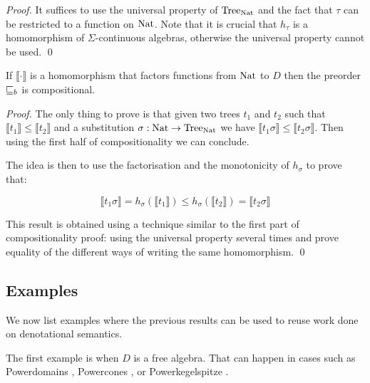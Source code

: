 \begin{proof}
    It suffices to use the universal property of $\textnormal{Tree}_{\textnormal{Nat}}$ 
    and the fact that $\tau$ can be restricted to a function 
    on $\textnormal{Nat}$. Note that it is crucial that $h_\tau$ is a 
    homomorphism of $\Sigma$-continuous algebras, 
    otherwise the universal property cannot be used.
\qed\end{proof}


\begin{lemma}
    If $\llbracket \cdot \rrbracket$ is a homomorphism 
    that factors functions from $\textnormal{Nat}$ to $D$ then 
    the preorder $\sqsubseteq_b$ is compositional.
\end{lemma}


\begin{proof}
    The only thing to prove is that given two trees $t_1$ and 
    $t_2$ such that $\llbracket t_1 \rrbracket \leq \llbracket t_2 \rrbracket$
    and a substitution $\sigma : \textnormal{Nat} \to \textnormal{Tree}_{\textnormal{Nat}}$ 
    we have $\llbracket t_1 \sigma \rrbracket \leq \llbracket t_2 \sigma
    \rrbracket$. 
    Then using the first half of compositionality we can conclude.

    The idea is then to use the factorisation and 
    the monotonicity of $h_\sigma$ to prove that:

    \begin{equation*}
        \llbracket t_1 \sigma \rrbracket 
        = h_\sigma (\llbracket t_1 \rrbracket) 
        \leq h_\sigma (\llbracket t_2 \rrbracket)
        = \llbracket t_2 \sigma \rrbracket 
    \end{equation*}

    This result is obtained using a technique similar 
    to the first part of compositionality proof: using 
    the universal property several times and prove 
    equality of the different ways of writing 
    the same homomorphism.
\qed\end{proof}


\subsection{Examples}

We now list examples where the previous results can be used 
to reuse work done on denotational semantics.

The first example is when $D$ is a free algebra. That 
can happen in cases such as Powerdomains 
\cite{abramsky1994}, Powercones \cite{tix2009semantic}, 
or Powerkegelspitze \cite{KeimelP2016}.

